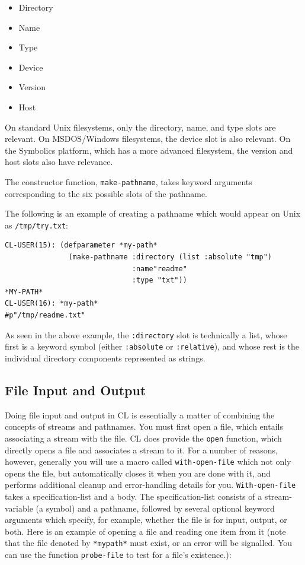 \begin{itemize}
\item Directory
\item Name
\item Type
\item Device
\item Version
\item Host
\end{itemize}

On standard Unix filesystems, only the directory, name, and type slots are relevant. On
MSDOS/Windows filesystems, the device slot is also relevant. On the Symbolics platform,
which has a more advanced filesystem, the version and host slots also have relevance.

The constructor function, \texttt{make-pathname}, takes keyword arguments corresponding to
the six possible slots of the pathname.

The following is an example of creating a pathname which would appear on Unix as
\texttt{/tmp/try.txt}:

\begin{verbatim}
CL-USER(15): (defparameter *my-path*
               (make-pathname :directory (list :absolute "tmp")
                              :name"readme"
                              :type "txt"))
*MY-PATH*
CL-USER(16): *my-path*
#p"/tmp/readme.txt"
\end{verbatim}

As seen in the above example, the \texttt{:directory} slot is technically a list, whose first is
a keyword symbol (either \texttt{:absolute} or \texttt{:relative}), and whose rest is the individual
directory components represented as strings.

\subsection{File Input and Output}

Doing file input and output in CL is essentially a matter of combining the concepts of
streams and pathnames. You must first open a file, which entails associating a stream
with the file. CL does provide the \texttt{open} function, which directly opens a file and associates a stream to it. For a number of reasons, however, generally you will use a macro
called \texttt{with-open-file} which not only opens the file, but automatically closes it when
you are done with it, and performs additional cleanup and error-handling details for you.
\texttt{With-open-file} takes a specification-list and a body. The specification-list consists of a
stream-variable (a symbol) and a pathname, followed by several optional keyword arguments which specify, for example, whether the file is for input, output, or both. Here is
an example of opening a file and reading one item from it (note that the file denoted by
\texttt{*mypath*} must exist, or an error will be signalled. You can use the function \texttt{probe-file}
to test for a file's existence.):

